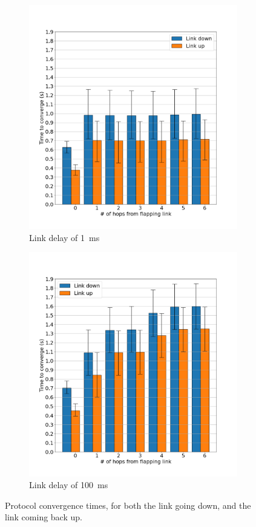 \documentclass[10pt,twoside,a4paper]{article}
\begin{document}
\begin{figure}[H]
\centering
\begin{subfigure}{.5\textwidth}
  \centering
  \includegraphics[width=1\linewidth]{conv_1ms}
  \caption{Link delay of \SI{1}{\ms}}
\end{subfigure}%
\begin{subfigure}{.5\textwidth}
  \centering
  \includegraphics[width=1\linewidth]{conv_100ms}
  \caption{Link delay of \SI{100}{\ms}}
\end{subfigure}
\caption{Protocol convergence times, for both the link going down, and the link coming back up.}
\end{figure}
\end{document}

